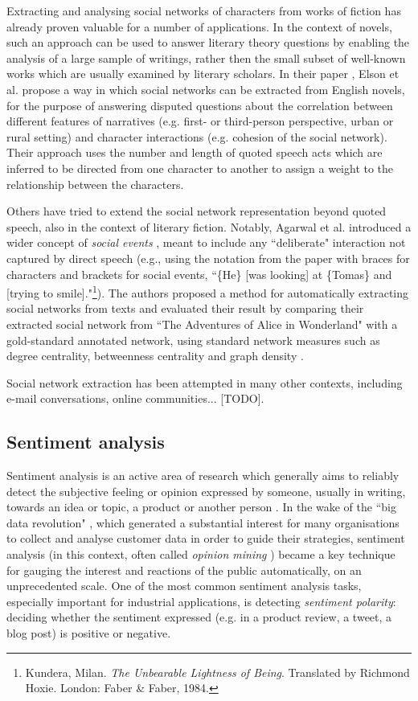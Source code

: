 \documentclass[bsc,frontabs,singlespacing,parskip, twoside]{infthesis}
\begin{document}
Extracting and analysing social networks of characters from works of fiction has already proven valuable for a number of applications. In the context of novels, such an approach can be used to answer literary theory questions by enabling the analysis of a large sample of writings, rather then the small subset of well-known works which are usually examined by literary scholars. In their paper \cite{Elson2010}, Elson et al. propose a way in which social networks can be extracted from English novels, for the purpose of answering disputed questions about the correlation between different features of narratives (e.g. first- or third-person perspective, urban or rural setting) and character interactions (e.g. cohesion of the social network). Their approach uses the number and length of quoted speech acts which are inferred to be directed from one character to another to assign a weight to the relationship between the characters.

Others have tried to extend the social network representation beyond quoted speech, also in the context of literary fiction. Notably, Agarwal et al. introduced a wider concept of \textit{social events} \cite{agarwal2010annotation}, meant to include any ``deliberate" interaction not captured by direct speech (e.g., using the notation from the paper with braces for characters and brackets for social events, ``\{He\} [was looking] at \{Tomas\} and [trying to smile]."\footnote{Kundera, Milan. \textit{The Unbearable Lightness of Being}. Translated by Richmond Hoxie. London: Faber \& Faber, 1984.}). The authors proposed a method for automatically extracting social networks from texts and evaluated their result  by comparing their extracted social network from ``The Adventures of Alice in Wonderland" with a gold-standard annotated network, using standard network measures such as degree centrality, betweenness centrality and graph density  \cite{Agarwal2013}.

Social network extraction has been attempted in many other contexts, including e-mail conversations, online communities... [TODO]. 

\subsection{Sentiment analysis}
\label{sec:bg_sentiment}
Sentiment analysis is an active area of research which generally aims to reliably detect the subjective feeling or opinion expressed by someone, usually in writing, towards an idea or topic, a product or another person \cite{varghesesurvey}. In the wake of the ``big data revolution" \cite{mayer2013big}, which generated a substantial interest for many organisations to collect and analyse customer data in order to guide their strategies, sentiment analysis (in this context, often called \textit{opinion mining} \cite{pang2008opinion}) became a key technique for gauging the interest and reactions of the public automatically, on an unprecedented scale. One of the most common sentiment analysis tasks, especially important for industrial applications, is detecting \textit{sentiment polarity}: deciding whether the sentiment expressed (e.g. in a product review, a tweet, a blog post) is positive or negative.
\end{document}
